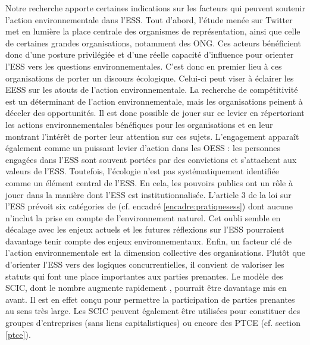         Notre recherche apporte certaines indications sur les facteurs qui peuvent soutenir l'action environnementale dans l'ESS. Tout d'abord, l'étude menée sur Twitter met en lumière la place centrale des organismes de représentation, ainsi que celle de certaines grandes organisations, notamment des ONG. Ces acteurs bénéficient donc d'une posture privilégiée et d'une réelle capacité d'influence pour orienter l'ESS vers les questions environnementales. C'est donc en premier lieu à ces organisations de porter un discours écologique. Celui-ci peut viser à éclairer les EESS sur les atouts de l'action environnementale. La recherche de compétitivité est un déterminant de l'action environnementale, mais les organisations peinent à déceler des opportunités. Il est donc possible de jouer sur ce levier en répertoriant les actions environnementales bénéfiques pour les organisations et en leur montrant l'intérêt de porter leur attention sur ces sujets. L'engagement apparaît également comme un puissant levier d'action dans les OESS : les personnes engagées dans l'ESS sont souvent portées par des convictions et s'attachent aux valeurs de l'ESS. Toutefois, l'écologie n'est pas systématiquement identifiée comme un élément central de l'ESS. En cela, les pouvoirs publics ont un rôle à jouer dans la manière dont l'ESS est institutionnalisée. L'article 3 de la loi sur l'ESS prévoit six catégories de  (cf. encadré \ref{encadre:pratiquesess}) dont aucune n'inclut la prise en compte de l'environnement naturel. Cet oubli semble en décalage avec les enjeux actuels et les futures réflexions sur l'ESS pourraient davantage tenir compte des enjeux environnementaux. Enfin, un facteur clé de l'action environnementale est la dimension collective des organisations. Plutôt que d'orienter l'ESS vers des logiques concurrentielles, il convient de valoriser les statuts qui font une place importantes aux parties prenantes. Le modèle des SCIC, dont le nombre augmente rapidement \parencite{observatoire_national_de_leconomie_sociale_et_solidaire_france2017atlas}, pourrait être davantage mis en avant. Il est en effet conçu pour permettre la participation de parties prenantes au sens très large. Les SCIC peuvent également être utilisées pour constituer des groupes d'entreprises (sans liens capitalistiques) ou encore des PTCE (cf. section \ref{ptce}). \\

